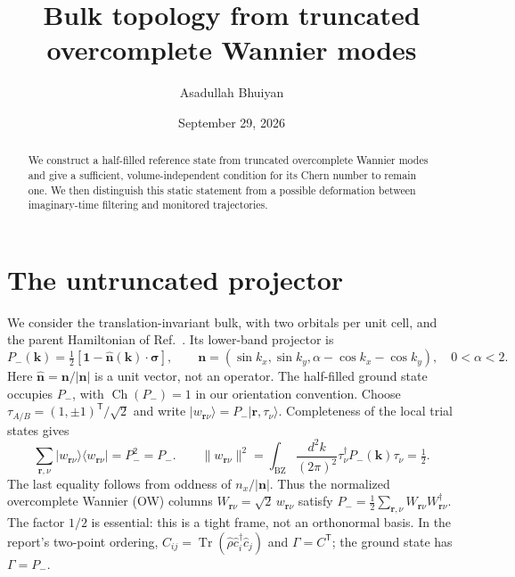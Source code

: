 \documentclass[aps,prb,onecolumn,nofootinbib,superscriptaddress]{revtex4-2}
\newcommand{\Id}{\mathbf{1}}
\newcommand{\Ch}{\operatorname{Ch}}
\newcommand{\br}{\boldsymbol r}
\newcommand{\bk}{\boldsymbol k}
\newcommand{\ket}[1]{\lvert#1\rangle}
\newcommand{\bra}[1]{\langle#1\rvert}
\begin{document}
\title{Bulk topology from truncated overcomplete Wannier modes}
\author{Asadullah Bhuiyan}
\noaffiliation
\date{September 29, 2026}
\begin{abstract}
We construct a half-filled reference state from truncated overcomplete Wannier
modes and give a sufficient, volume-independent condition for its Chern number
to remain one. We then distinguish this static statement from a possible
deformation between imaginary-time filtering and monitored trajectories.
\end{abstract}
\maketitle
\setcounter{tocdepth}{2}
\tableofcontents

\section{The untruncated projector}
We consider the translation-invariant bulk, with two orbitals per unit cell,
and the parent Hamiltonian of Ref.~\cite{BPJ}. Its lower-band projector is
\begin{equation}
 P_-(\bk)=\tfrac12[\Id-\widehat{\boldsymbol n}(\bk)\cdot\boldsymbol\sigma],
 \qquad \boldsymbol n=(\sin k_x,\sin k_y,\alpha-\cos k_x-\cos k_y),
 \quad 0<\alpha<2 . \label{eq:parent}
\end{equation}
Here $\widehat{\boldsymbol n}=\boldsymbol n/|\boldsymbol n|$ is a unit vector,
not an operator. The half-filled ground state occupies $P_-$, with
$\Ch(P_-)=1$ in our orientation convention. Choose
$\tau_{A/B}=(1,\pm1)^{\mathsf T}/\sqrt2$ and write
$\ket{w_{\br\nu}}=P_-\ket{\br,\tau_\nu}$.
Completeness of the local trial states gives
\begin{equation}
 \sum_{\br,\nu}\ket{w_{\br\nu}}\bra{w_{\br\nu}}=P_-^2=P_-.
 \qquad
 \|w_{\br\nu}\|^2=\int_{\mathrm{BZ}}\frac{d^2k}{(2\pi)^2}
 \tau_\nu^\dagger P_-(\bk)\tau_\nu=\tfrac12 . \label{eq:tight}
\end{equation}
The last equality follows from oddness of $n_x/|\boldsymbol n|$.
Thus the normalized overcomplete Wannier (OW) columns
$W_{\br\nu}=\sqrt2\,w_{\br\nu}$ satisfy
$P_-=\frac12\sum_{\br,\nu}W_{\br\nu}W_{\br\nu}^\dagger$.
The factor $1/2$ is essential: this is a tight frame, not an orthonormal basis.
In the report's two-point ordering,
$C_{ij}=\operatorname{Tr}(\hat\rho\hat c_i^\dagger\hat c_j)$ and
$\Gamma=C^{\mathsf T}$; the ground state has $\Gamma=P_-$.
\end{document}
